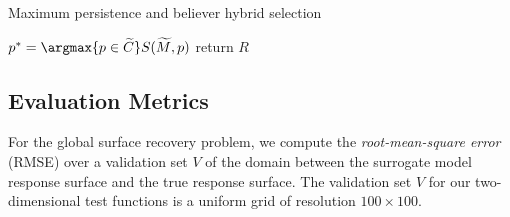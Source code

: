 {\fontsize{10}{10}\selectfont
\begin{algorithm}
\scriptsize
\caption{Maximum persistence and believer hybrid selection}
\label{algo:maxp-believe}
\begin{algorithmic}
    \State $p^* = \argmax{p \in \widetilde{C}} S(\widetilde{M}, p)$
  \EndWhile
\EndWhile
\State return $R$
\EndProcedure
\end{algorithmic}
\end{algorithm}
}

\subsection{Evaluation Metrics}
\label{sec:evaluation_metrics}
%
For the global surface recovery problem, we compute the \emph{root-mean-square error} (RMSE) over a validation set $V$ of the domain between the surrogate model response surface and the true response surface.
%
The validation set $V$ for our two-dimensional test functions is a uniform grid of resolution $100\times100$.

